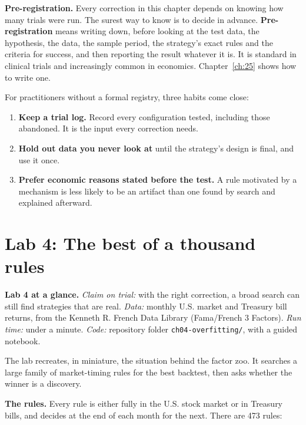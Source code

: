 \textbf{Pre-registration.} Every correction in this chapter depends on knowing how many trials were run. The surest way to know is to decide in advance. \textbf{Pre-registration} means writing down, before looking at the test data, the hypothesis, the data, the sample period, the strategy's exact rules and the criteria for success, and then reporting the result whatever it is. It is standard in clinical trials and increasingly common in economics. Chapter~\ref{ch:25} shows how to write one.

For practitioners without a formal registry, three habits come close:

\begin{enumerate}
  \item \textbf{Keep a trial log.} Record every configuration tested, including those abandoned. It is the input every correction needs.
  \item \textbf{Hold out data you never look at} until the strategy's design is final, and use it once.
  \item \textbf{Prefer economic reasons stated before the test.} A rule motivated by a mechanism is less likely to be an artifact than one found by search and explained afterward.
\end{enumerate}

\section{Lab 4: The best of a thousand rules}
\label{sec:04-lab}

\begin{callout}
\textbf{Lab 4 at a glance.} \emph{Claim on trial:} with the right correction, a broad search can still find strategies that are real. \emph{Data:} monthly U.S. market and Treasury bill returns, from the Kenneth R. French Data Library (Fama/French 3 Factors). \emph{Run time:} under a minute. \emph{Code:} repository folder \texttt{ch04-overfitting/}, with a guided notebook.
\end{callout}

The lab recreates, in miniature, the situation behind the factor zoo. It searches a large family of market-timing rules for the best backtest, then asks whether the winner is a discovery.

\textbf{The rules.} Every rule is either fully in the U.S. stock market or in Treasury bills, and decides at the end of each month for the next. There are 473 rules:

